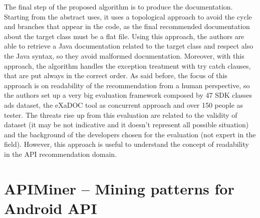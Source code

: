 The final step of the proposed algorithm is to produce the documentation. 
Starting from the abstract uses, it uses a topological approach to avoid the 
cycle and branches that appear in the code, as the final recommended 
documentation about the target class must be a flat file. Using this approach, 
the authors are able to retrieve a Java documentation related to the target 
class and respect also the Java syntax, so they avoid malformed documentation. 
Moreover, with this approach, the algorithm handles the exception treatment 
with try catch clauses, that are put always in the correct order. As said 
before, the focus of this approach is on readability of the recommendation from 
a human perspective, so the authors set up a very big evaluation framework 
composed by 47 SDK classes ads dataset, the eXaDOC tool as concurrent approach 
and over 150 people as tester. The threats rise up from this evaluation are 
related to the validity of dataset (it may be not indicative and it doesn't 
represent all possible situation) and the background of the developers chosen 
for the evaluation (not expert in the field). However, this approach is useful 
to understand the concept of readability in the API recommendation domain.

\section{APIMiner -- Mining patterns for Android API}

